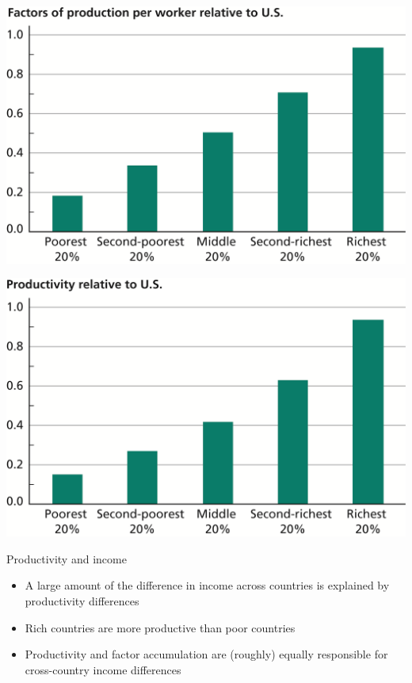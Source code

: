 \documentclass[10pt]{beamer}
\begin{document}
\begin{frame}[label={sec:org931c509}]{}
\begin{center}
\includegraphics[width=.75\textwidth]{./img/7.3.png}
\end{center}
\end{frame}

\begin{frame}[label={sec:orgbf720d6}]{}
\begin{center}
\includegraphics[width=.75\textwidth]{./img/7.4.png}
\end{center}
\end{frame}

\begin{frame}[label={sec:org9d1dc9d}]{}
\alert{Productivity and income}
\begin{itemize}
\item A large amount of the difference in income across countries is explained by productivity differences
\item Rich countries are more productive than poor countries
\item Productivity and factor accumulation are (roughly) equally responsible for cross-country income differences
\end{itemize}
\end{frame}
\end{document}
